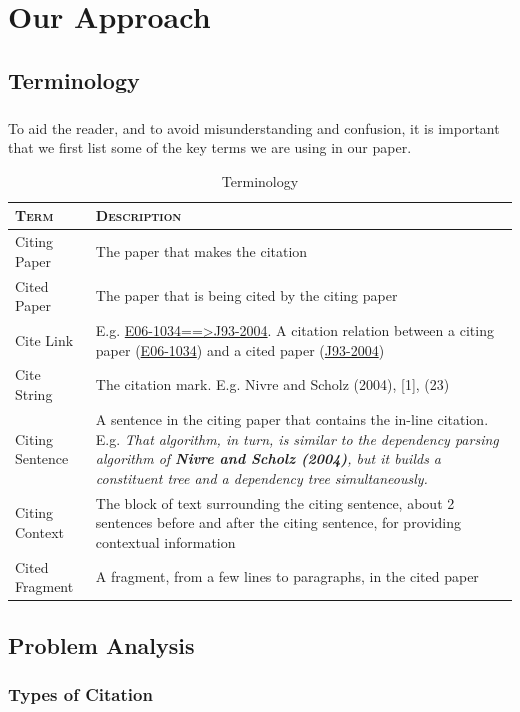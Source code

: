 \chapter{Our Approach}
\label{approach}
\section{Terminology}
\paragraph{}
To aid the reader, and to avoid misunderstanding and confusion, it is important that we first list some of the key terms we are using in our paper.
\begin{table}[h]
	\center
	\begin{tabular}{ l p{13cm}}
		\textsc{Term} & \textsc{Description}\\
		\hline
		Citing Paper & The paper that makes the citation \\
		Cited Paper & The paper that is being cited by the citing paper \\
		Cite Link & E.g. \url{E06-1034==>J93-2004}. A citation relation between a citing paper (\url{E06-1034}) and a cited paper (\url{J93-2004}) \\
		Cite String & The citation mark. E.g. Nivre and Scholz (2004), [1], (23) \\
		Citing Sentence & A sentence in the citing paper that contains the in-line citation. E.g. \textit{That algorithm, in turn, is similar to the dependency parsing algorithm of \textbf{Nivre and Scholz (2004)}, but it builds a constituent tree and a dependency tree simultaneously.} \\
		Citing Context & The block of text surrounding the citing sentence, about 2 sentences before and after the citing sentence, for providing contextual information \\
		Cited Fragment & A fragment, from a few lines to paragraphs, in the cited paper
	\end{tabular}
	\caption{Terminology}
	\label{tab:terminology}
\end{table}

\section{Problem Analysis}
\subsection{Types of Citation}
